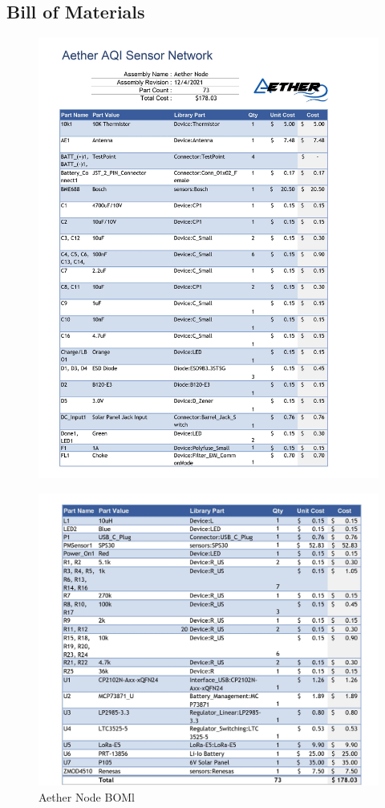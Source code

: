 \subsection{Bill of Materials}
\begin{figure}
    \centering
    \includegraphics[width=7in]{figures/BOM_1.jpg}
    \label{fig:BOM_1} 
\end{figure}
\begin{figure}
    \centering
    \includegraphics[width=6in]{figures/BOM_2.jpg}
    \caption{Aether Node BOMl}
    \label{fig:BOM_2} 
\end{figure}